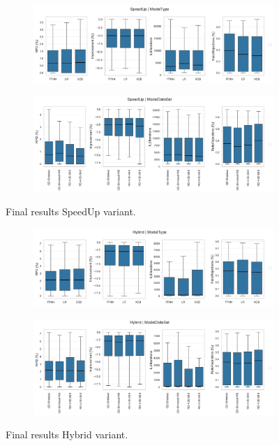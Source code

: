 \begin{figure}[!ht]
	\centering
	\begin{subfigure}[t]{\textwidth}
		\centering
		\includegraphics[width=0.9\linewidth]{pictures/final_results/ModelType_SpeedUp_boxplot_final_results.png}
	\end{subfigure}
	\begin{subfigure}[t]{\textwidth}
		\centering
		\includegraphics[width=0.9\linewidth]{pictures/final_results/ModelDataSet_SpeedUp_boxplot_final_results.png}
	\end{subfigure}
	\caption{Final results SpeedUp variant.}
	\label{fig:final_results_speedup_variant}
\end{figure}

\begin{figure}[!ht]
	\centering
	\begin{subfigure}[t]{\textwidth}
		\centering
		\includegraphics[width=0.9\linewidth]{pictures/final_results/ModelType_Hybrid_boxplot_final_results.png}
	\end{subfigure}
	\begin{subfigure}[t]{\textwidth}
		\centering
		\includegraphics[width=0.9\linewidth]{pictures/final_results/ModelDataSet_Hybrid_boxplot_final_results.png}
	\end{subfigure}
	\caption{Final results Hybrid variant.}
	\label{fig:final_results_hybrid_variant}
\end{figure}


